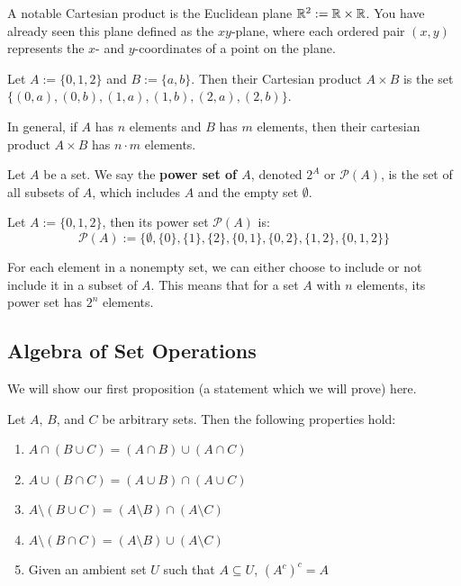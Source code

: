 A notable Cartesian product is the Euclidean plane $\mathbb{R}^2 := \mathbb{R} \times \mathbb{R}$. You have already seen this plane defined as the $xy$-plane, where each ordered pair $(x,y)$ represents the $x$- and $y$-coordinates of a point on the plane.

\begin{example}
   Let $A := \{0, 1, 2\}$ and $B := \{a, b\}$. Then their Cartesian product $A \times B$ is the set $\{(0,a), (0,b), (1,a), (1,b), (2,a), (2,b)\}$.
\end{example}

\begin{remark}
   In general, if $A$ has $n$ elements and $B$ has $m$ elements, then their cartesian product $A \times B$ has $n \cdot m$ elements.
\end{remark}

\begin{defbox}
   Let $A$ be a set. We say the \textbf{power set of $A$}, denoted $2^A$ or $\mathscr{P}(A)$, is the set of all subsets of $A$, which includes $A$ and the empty set $\emptyset$. 
\end{defbox}

\begin{example}
   Let $A := \{0, 1, 2\}$, then its power set $\mathscr{P}(A)$ is: 
   \[ \mathscr{P}(A) := \{\emptyset, \{0\}, \{1\}, \{2\}, \{0, 1\}, \{0, 2\}, \{1, 2\}, \{0, 1, 2\}\} \]
\end{example}

\begin{remark}
   For each element in a nonempty set, we can either choose to include or not include it in a subset of $A$. This means that for a set $A$ with $n$ elements, its power set has $2^n$ elements.  
\end{remark}

\subsection{Algebra of Set Operations}

We will show our first proposition (a statement which we will prove) here.

\begin{propbox}
   Let $A$, $B$, and $C$ be arbitrary sets. Then the following properties hold:
   \begin{enumerate}
      \item $A \cap (B \cup C) = (A \cap B) \cup (A \cap C)$
      \item $A \cup (B \cap C) = (A \cup B) \cap (A \cup C)$
      \item $A \setminus (B \cup C) = (A \setminus B) \cap (A \setminus C)$
      \item $A \setminus (B \cap C) = (A \setminus B) \cup (A \setminus C)$
      \item Given an ambient set $U$ such that $A \subseteq U$, $(A^c)^c = A$
   \end{enumerate}
\end{propbox}

